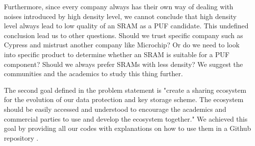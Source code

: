Furthermore, since every company always has their own way of dealing with noises introduced by high density level, we cannot conclude that high density level always lead to low quality of an SRAM as a PUF candidate. This undefined conclusion lead us to other questions. Should we trust specific company such as Cypress and mistrust another company like Microchip? Or do we need to look into specific product to determine whether an SRAM is suitable for a PUF component? Should we always prefer SRAMs with less density? We suggest the communities and the academics to study this thing further.

The second goal defined in the problem statement is "create a sharing ecosystem for the evolution of our data protection and key storage scheme. The ecosystem should be easily accessed and understood to encourage the academics and commercial parties to use and develop the ecosystem together." We achieved this goal by providing all our codes with explanations on how to use them in a Github repository \cite{repository}.
%


